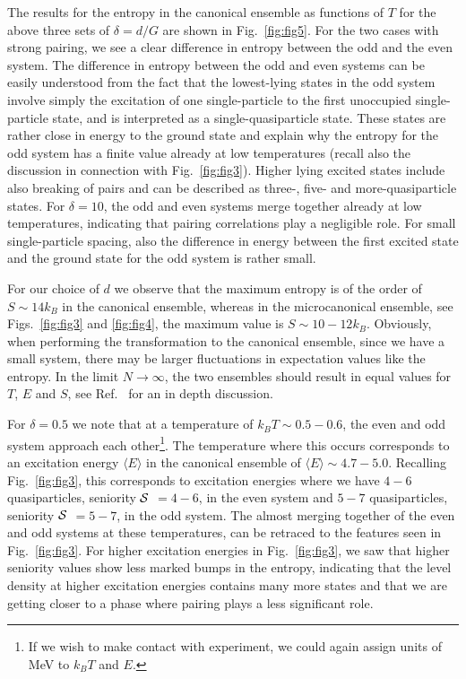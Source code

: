 The results for the entropy in the canonical ensemble as functions of $T$ for the above three sets of $\delta=d/G$ are shown in Fig.\ \ref{fig:fig5}. For the two cases with strong pairing, we see a clear difference in entropy between the odd and the even system. The difference in entropy between the odd and even systems can be easily understood from the fact that the lowest-lying states in the odd system involve simply the excitation of one single-particle to the first unoccupied single-particle state, and is interpreted as a single-quasiparticle state. These states are rather close in energy to the ground state and explain why the entropy for the odd system has a finite value already at low temperatures (recall also the discussion in connection with Fig.\ \ref{fig:fig3}). Higher lying excited states include also breaking of pairs and can be described as three-, five- and more-quasiparticle states. For $\delta=10$, the odd and even systems merge together already at low temperatures, indicating that pairing correlations play a negligible role. For small single-particle spacing, also the difference in energy between the first excited state and the ground state for the odd system is rather small. 

For our choice of $d$ we observe that the maximum entropy is of the order of $S\sim 14 k_B$ in the canonical ensemble, whereas in the microcanonical ensemble, see Figs.\ \ref{fig:fig3} and \ref{fig:fig4}, the maximum value is $S \sim 10-12 k_B $. Obviously, when performing the transformation to the canonical ensemble, since we have a small system, there may be larger fluctuations in expectation values like the entropy. In the limit $N\rightarrow \infty$, the two ensembles should result in equal values for $T$, $E$ and $S$,
see Ref.\ \cite{gross99} for an in depth discussion.

For $\delta=0.5$ we note that at a temperature of $k_BT \sim 0.5-0.6$, the even and odd system approach each other\footnote{If we wish to make contact with experiment, we could again assign units of MeV to $k_BT$ and $E$.}. The temperature where this occurs corresponds to an excitation energy $\langle E\rangle$ in the canonical ensemble of $\langle E\rangle \sim 4.7-5.0$. Recalling Fig.\ \ref{fig:fig3}, this corresponds to excitation energies where we have $4-6$ quasiparticles, seniority ${\cal S}$ $=4-6$, in the even system and $5-7$ quasiparticles, seniority ${\cal S}$ $=5-7$, in the odd system. The almost merging together of the even and odd systems at these temperatures, can be retraced to the features seen in Fig.\ \ref{fig:fig3}. For higher excitation energies in Fig.\ \ref{fig:fig3}, we saw that higher seniority values show less marked bumps in the entropy, indicating that the level density at higher excitation energies contains many more states and that we are getting closer to a phase where pairing plays a less significant role. 

